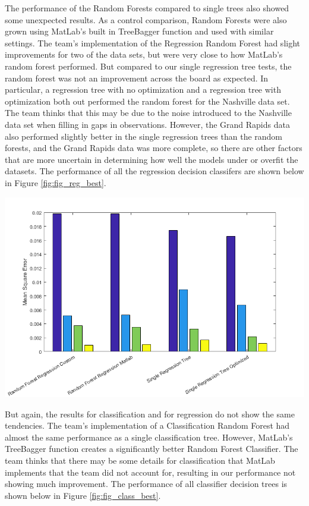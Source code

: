 \documentclass[10pt]{article}
\begin{document}
\begin{multicols}{2}
		The performance of the Random Forests compared to single trees also showed some unexpected results. As a control comparison, Random Forests were also grown using MatLab's built in TreeBagger function and used with similar settings. The team's implementation of the Regression Random Forest had slight improvements for two of the data sets, but were very close to how MatLab's random forest performed. But compared to our single regression tree tests, the random forest was not an improvement across the board as expected. In particular, a regression tree with no optimization and a regression tree with optimization both out performed the random forest for the Nashville data set. The team thinks that this may be due to the noise introduced to the Nashville data set when filling in gaps in observations. However, the Grand Rapids data also performed slightly better in the single regression trees than the random forests, and the Grand Rapids data was more complete, so there are other factors that are more uncertain in determining how well the models under or overfit the datasets. The performance of all the regression decision classifers are shown below in Figure \ref{fig:fig_reg_best}.

		\begin{center}
		\captionsetup{type=figure}
			\includegraphics[scale=0.40]{Images/RegressionResults} \\
			\label{fig:fig_reg_best}
		\end{center}

		But again, the results for classification and for regression do not show the same tendencies. The team's implementation of a Classification Random Forest had almost the same performance as a single classification tree. However, MatLab's TreeBagger function creates a significantly better Random Forest Classifier. The team thinks that there may be some details for classification that MatLab implements that the team did not account for, resulting in our performance not showing much improvement. The performance of all classifier decision trees is shown below in Figure \ref{fig:fig_class_best}.


\end{multicols}
\end{document}
